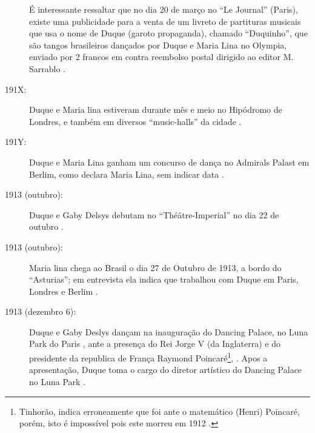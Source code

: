 \begin{description}
É interessante ressaltar que no dia 20 de março no ``Le Journal'' (Paris), existe uma publicidade 
para a venta de um livreto de partituras musicais que usa o nome de Duque (garoto propaganda),
chamado ``Duquinho'', que são tangos brasileiros dançados por Duque e Maria Lina no Olympia,
enviado por 2 francos em contra reembolso postal dirigido ao editor M. Sarrablo \cite[pp. 7]{maxixe1913reidotango:2}.

\item[191X:] Duque e Maria lina estiveram durante mês e meio no Hipódromo de Londres,
e também em diversos ``music-halls'' da cidade
\cite[pp. 3]{maxixe1913marialina} \cite[pp. 83]{tinhorao1986pequena} \cite[pp. 1]{maxixeparis1915:0}.

\item[191Y:] Duque e Maria Lina  ganham um concurso de dança no Admirals Palast em Berlim,
como declara Maria Lina, sem indicar data \cite[pp. 3]{maxixe1913marialina} \cite[pp. 83]{tinhorao1986pequena}.

\item[1913 (outubro):] Duque e Gaby Delsys debutam no ``Théâtre-Imperial''
no dia 22 de outubro \cite[pp. 5]{maxixe1913duquegaby:3}.

\item[1913 (outubro):] Maria lina chega ao Brasil o dia 27 de Outubro de 1913,
a bordo do ``Asturias''; 
em entrevista ela indica que trabalhou com Duque em Paris, Londres e Berlim 
\cite[pp. 8]{maxixe1913marialina:0}\cite[pp. 3]{maxixe1913marialina}.


 



\item[1913 (dezembro 6):] Duque e Gaby Deslys dançam na
inauguração do Dancing Palace, no Luna Park do Paris 
\cite[pp. 14]{maxixeparis1914} \cite{maxixe1913dancingpalace:1}, 
ante a presença do Rei Jorge V (da Inglaterra) e 
do presidente da republica de França  Raymond Poincaré\footnote{Tinhorão,
indica erroneamente que foi ante o matemático (Henri) Poincaré,
porém, isto é impossível pois este morreu em 1912  \cite[pp. 84]{tinhorao1986pequena}.}, 
\cite[pp. 73]{shaw2018tropical}.
Apos a apresentação, Duque toma o cargo do diretor artístico do Dancing Palace no Luna Park \cite[pp. 4]{maxixe1913dancingpalace:2}.


\end{description}
